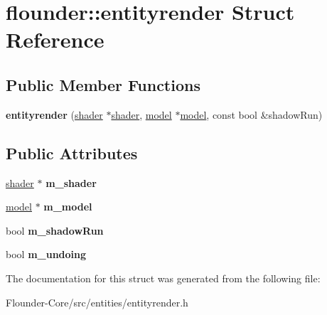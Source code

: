 \hypertarget{structflounder_1_1entityrender}{}\section{flounder\+:\+:entityrender Struct Reference}
\label{structflounder_1_1entityrender}
\subsection*{Public Member Functions}
\begin{DoxyCompactItemize}
\item 
\mbox{\label{structflounder_1_1entityrender_a0d1f261c565e5e86d28448734a12111f}} 
{\bfseries entityrender} (\hyperlink{classflounder_1_1shader}{shader} $\ast$\hyperlink{classflounder_1_1shader}{shader}, \hyperlink{classflounder_1_1model}{model} $\ast$\hyperlink{classflounder_1_1model}{model}, const bool \&shadow\+Run)
\end{DoxyCompactItemize}
\subsection*{Public Attributes}
\begin{DoxyCompactItemize}
\item 
\mbox{\label{structflounder_1_1entityrender_adaaf488215b0798d241de923d8f1bc22}} 
\hyperlink{classflounder_1_1shader}{shader} $\ast$ {\bfseries m\+\_\+shader}
\item 
\mbox{\label{structflounder_1_1entityrender_aadcffd8cb210169c87833c4b335d39a4}} 
\hyperlink{classflounder_1_1model}{model} $\ast$ {\bfseries m\+\_\+model}
\item 
\mbox{\label{structflounder_1_1entityrender_ad82f38909903807774d7715c2db2ab2a}} 
bool {\bfseries m\+\_\+shadow\+Run}
\item 
\mbox{\label{structflounder_1_1entityrender_a6d0a02d6c97834d50c59d7bcccfd34c7}} 
bool {\bfseries m\+\_\+undoing}
\end{DoxyCompactItemize}


The documentation for this struct was generated from the following file\+:\begin{DoxyCompactItemize}
\item 
Flounder-\/\+Core/src/entities/entityrender.\+h\end{DoxyCompactItemize}
